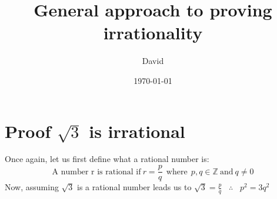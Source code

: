 \documentclass{article}
\title{General approach to proving irrationality}
\author{David}
\date{\today}
\begin{document}
\maketitle

\section{Proof $\sqrt{3}$ is irrational}
Once again, let us first define what a rational number is:
\begin{equation}
    \text{A number r is rational if} \ r=\frac{p}{q} \ \ \text{where} \ \ p,q \in \mathbb{Z} \ \text{and} \ q \neq 0 
\end{equation}
Now, assuming $\sqrt{3}$ is a rational number leads us to $\sqrt{3}=\frac{p}{q}$ \ $\therefore$ \ $p^2=3q^2$
\end{document}
